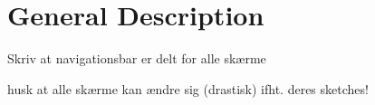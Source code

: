 \section{General Description}

Skriv at navigationsbar er delt for alle skærme

husk at alle skærme kan ændre sig (drastisk) ifht. deres sketches!